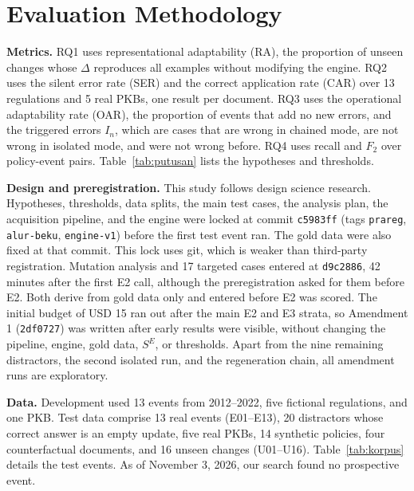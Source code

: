 \documentclass[conference]{IEEEtran}
\newcommand{\SE}{S^{E}}
\begin{document}
\section{Evaluation Methodology}
\label{sec:evaluasi}
\textbf{Metrics.} RQ1 uses representational adaptability (RA), the proportion of unseen changes whose $\Delta$ reproduces all examples without modifying the engine. RQ2 uses the silent error rate (SER) and the correct application rate (CAR) over 13 regulations and 5 real PKBs, one result per document. RQ3 uses the operational adaptability rate (OAR), the proportion of events that add no new errors, and the triggered errors $I_n$, which are cases that are wrong in chained mode, are not wrong in isolated mode, and were not wrong before. RQ4 uses recall and $F_2$ over policy-event pairs. Table~\ref{tab:putusan} lists the hypotheses and thresholds.

\textbf{Design and preregistration.} This study follows design science research. Hypotheses, thresholds, data splits, the main test cases, the analysis plan, the acquisition pipeline, and the engine were locked at commit \texttt{c5983ff} (tags \texttt{prareg}, \texttt{alur-beku}, \texttt{engine-v1}) before the first test event ran. The gold data were also fixed at that commit. This lock uses git, which is weaker than third-party registration. Mutation analysis and 17 targeted cases entered at \texttt{d9c2886}, 42 minutes after the first E2 call, although the preregistration asked for them before E2. Both derive from gold data only and entered before E2 was scored. The initial budget of USD 15 ran out after the main E2 and E3 strata, so Amendment 1 (\texttt{2df0727}) was written after early results were visible, without changing the pipeline, engine, gold data, $\SE$, or thresholds. Apart from the nine remaining distractors, the second isolated run, and the regeneration chain, all amendment runs are exploratory.

\textbf{Data.} Development used 13 events from 2012--2022, five fictional regulations, and one PKB. Test data comprise 13 real events (E01--E13), 20 distractors whose correct answer is an empty update, five real PKBs, 14 synthetic policies, four counterfactual documents, and 16 unseen changes (U01--U16). Table~\ref{tab:korpus} details the test events. As of November 3, 2026, our search found no prospective event.
\end{document}
